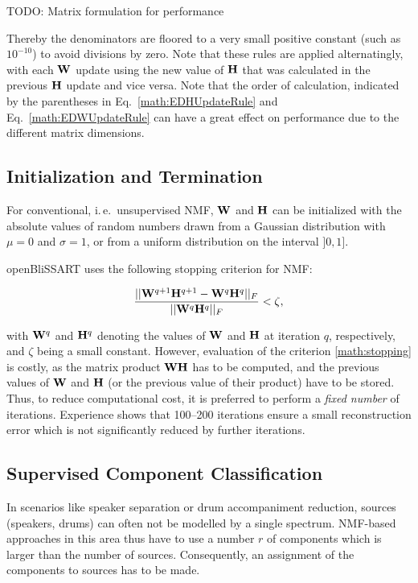 TODO: Matrix formulation for performance

Thereby the denominators are floored to a very small positive constant (such as
$10^{-10}$) to avoid divisions by zero. Note that these rules are applied
alternatingly, with each $\mathbf{W}$ update using the new value of $\mathbf{H}$ that
was calculated in the previous $\mathbf{H}$ update and vice versa. Note that the
order of calculation, indicated by the parentheses in
Eq.~\ref{math:EDHUpdateRule} and Eq.~\ref{math:EDWUpdateRule} can have a great
effect on performance due to the different matrix dimensions.


\subsection{Initialization and Termination}

For conventional, i.\,e.\ unsupervised NMF, $\mathbf{W}$ and $\mathbf{H}$ can be initialized with the absolute values of random numbers drawn from a
Gaussian distribution with $\mu = 0$ and $\sigma = 1$, or from a uniform distribution on the interval $]0,1]$. 

openBliSSART uses the following stopping criterion for NMF:

\begin{equation}
    \label{math:stopping}
    \frac{||\mathbf{W}^{q+1}\mathbf{H}^{q+1} - \mathbf{W}^{q}\mathbf{H}^{q}||_F}
         {||\mathbf{W}^{q}\mathbf{H}^{q}||_F}
    < \zeta ,
\end{equation}

\noindent with $\mathbf{W}^q$ and $\mathbf{H}^q$ denoting the values of $\mathbf{W}$ and
$\mathbf{H}$ at iteration $q$, respectively, and $\zeta$ being a small constant.
However, evaluation of the criterion \ref{math:stopping} is costly, as the
matrix product $\mathbf{WH}$ has to be computed, and the previous values of
$\mathbf{W}$ and $\mathbf{H}$ (or the previous value of their product) have to be
stored. Thus, to reduce computational cost, it is preferred to perform a \emph{fixed
number} of iterations. Experience shows that 100--200 iterations ensure a small
reconstruction error which is not significantly reduced by further iterations.


\subsection{Supervised Component Classification}

\label{sec:nmfbss}

In scenarios like speaker separation or drum accompaniment reduction, sources
(speakers, drums) can often not be modelled by a single spectrum. NMF-based
approaches in this area thus have to use a number $r$ of components which is
larger than the number of sources. Consequently, an assignment of the
components to sources has to be made.

